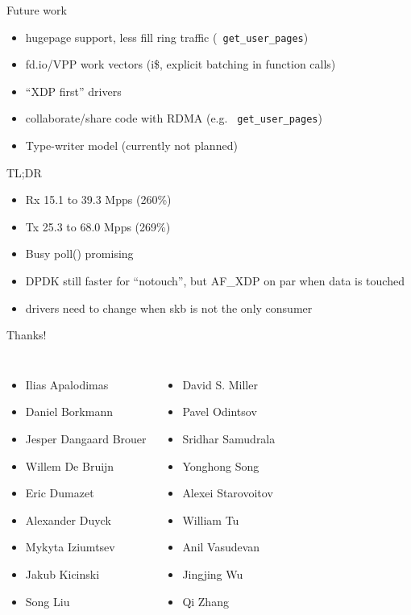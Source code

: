 \documentclass[aspectratio=169]{beamer}
\begin{document}
  \begin{frame}{Future work}
    \begin{itemize}
    \item hugepage support, less fill ring traffic ({\tt
      get\_user\_pages})
    \item fd.io/VPP work vectors (i\$, explicit batching in function calls)
    \item ``XDP first'' drivers 
    \item collaborate/share code with RDMA (e.g. {\tt
      get\_user\_pages})
    \item Type-writer model (currently not planned)
    \end{itemize}
  \end{frame}

  \begin{frame}{TL;DR}
  \begin{itemize}
  \item Rx 15.1 to 39.3 Mpps (260\%)
  \item Tx 25.3 to 68.0 Mpps (269\%)
  \item Busy poll() promising
  \item DPDK still faster for ``notouch'', but AF\_XDP on par when data is touched
  \item drivers need to change when skb is not the only consumer
  \end{itemize}
  \end{frame}

  \begin{frame}{Thanks!}
  \begin{columns}[T,onlytextwidth]
    \begin{itemize}
    \item Ilias Apalodimas
    \item Daniel Borkmann
    \item Jesper Dangaard Brouer
    \item Willem De Bruijn
    \item Eric Dumazet
    \item Alexander Duyck
    \item Mykyta Iziumtsev
    \item Jakub Kicinski
    \item Song Liu
    \end{itemize}
    
    \begin{itemize}
    \item David S. Miller
    \item Pavel Odintsov
    \item Sridhar Samudrala
    \item Yonghong Song
    \item Alexei Starovoitov
    \item William Tu
    \item Anil Vasudevan
    \item Jingjing Wu
    \item Qi Zhang
    \end{itemize}
  \end{columns}
  \end{frame}
\end{document}
